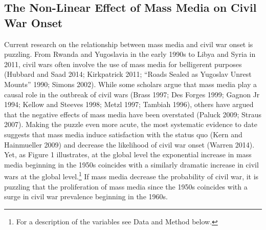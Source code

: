 \documentclass[12pt,article,oneside]{memoir}
\author{}
\date{}
\begin{document}
  
\setsansfont[Mapping=tex-text]{Gill Sans} 
\setmonofont[Mapping=tex-text,Scale=0.8]{Consolas}
\pagestyle{kjh}

\begin{centering}

\section{The Non-Linear Effect of Mass Media on Civil War Onset}

\end{centering}

\vspace{2em}

\doublespacing

Current research on the relationship between mass media and civil war
onset is puzzling. From Rwanda and Yugoslavia in the early 1990s to
Libya and Syria in 2011, civil wars often involve the use of mass media
for belligerent purposes (Hubbard and Saad 2014; Kirkpatrick 2011;
``Roads Sealed as Yugoslav Unrest Mounts'' 1990; Simons 2002). While
some scholars argue that mass media play a causal role in the outbreak
of civil wars (Brass 1997; Des Forges 1999; Gagnon Jr 1994; Kellow and
Steeves 1998; Metzl 1997; Tambiah 1996), others have argued that the
negative effects of mass media have been overstated (Paluck 2009; Straus
2007). Making the puzzle even more acute, the most systematic evidence
to date suggests that mass media induce satisfaction with the status quo
(Kern and Hainmueller 2009) and decrease the likelihood of civil war
onset (Warren 2014). Yet, as Figure 1 illustrates, at the global level
the exponential increase in mass media beginning in the 1950s coincides
with a similarly dramatic increase in civil wars at the global
level.\footnote{For a description of the variables see Data and Method
  below.} If mass media decrease the probability of civil war, it is
puzzling that the proliferation of mass media since the 1950s coincides
with a surge in civil war prevalence beginning in the 1960s.
\end{document}
